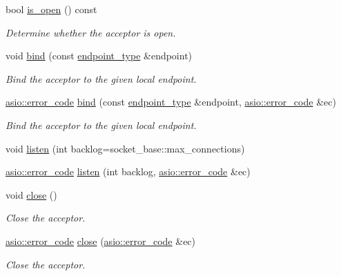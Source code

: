 \begin{DoxyCompactItemize}
bool \hyperlink{classasio_1_1basic__socket__acceptor_ad42e955859b44bccb7dd862df90c5655}{is\+\_\+open} () const 
\begin{DoxyCompactList}\small\item\em Determine whether the acceptor is open. \end{DoxyCompactList}\item 
void \hyperlink{classasio_1_1basic__socket__acceptor_a513b6fc8e25f355d3970f305eefac406}{bind} (const \hyperlink{classasio_1_1basic__socket__acceptor_a393d69e2f8a370aaa13a9018af4c0048}{endpoint\+\_\+type} \&endpoint)
\begin{DoxyCompactList}\small\item\em Bind the acceptor to the given local endpoint. \end{DoxyCompactList}\item 
\hyperlink{classasio_1_1error__code}{asio\+::error\+\_\+code} \hyperlink{classasio_1_1basic__socket__acceptor_a4122fb3452c405d8869ca2eefe85475d}{bind} (const \hyperlink{classasio_1_1basic__socket__acceptor_a393d69e2f8a370aaa13a9018af4c0048}{endpoint\+\_\+type} \&endpoint, \hyperlink{classasio_1_1error__code}{asio\+::error\+\_\+code} \&ec)
\begin{DoxyCompactList}\small\item\em Bind the acceptor to the given local endpoint. \end{DoxyCompactList}\item 
void \hyperlink{classasio_1_1basic__socket__acceptor_a05d696cd8d5d5c21375be583bd30d492}{listen} (int backlog=socket\+\_\+base\+::max\+\_\+connections)
\item 
\hyperlink{classasio_1_1error__code}{asio\+::error\+\_\+code} \hyperlink{classasio_1_1basic__socket__acceptor_a6b5d0d4df74d3fe90985cd5714650f23}{listen} (int backlog, \hyperlink{classasio_1_1error__code}{asio\+::error\+\_\+code} \&ec)
\item 
void \hyperlink{classasio_1_1basic__socket__acceptor_a48e36d9d2248efde8d85e339c5695e06}{close} ()
\begin{DoxyCompactList}\small\item\em Close the acceptor. \end{DoxyCompactList}\item 
\hyperlink{classasio_1_1error__code}{asio\+::error\+\_\+code} \hyperlink{classasio_1_1basic__socket__acceptor_ae56dea43b3cd00dbc7d432c267d020c1}{close} (\hyperlink{classasio_1_1error__code}{asio\+::error\+\_\+code} \&ec)
\begin{DoxyCompactList}\small\item\em Close the acceptor. \end{DoxyCompactList}\item 

\end{DoxyCompactItemize}
